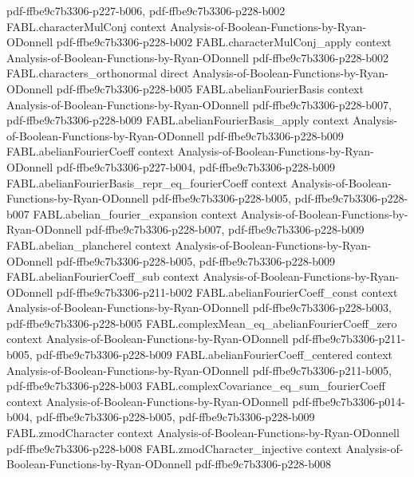 \begin{theorem}
  {pdf-ffbe9c7b3306-p227-b006,
    pdf-ffbe9c7b3306-p228-b002}
\proofstep
  {FABL.characterMulConj}
  {context}
  {Analysis-of-Boolean-Functions-by-Ryan-ODonnell}
  {pdf-ffbe9c7b3306-p228-b002}
\proofstep
  {FABL.characterMulConj_apply}
  {context}
  {Analysis-of-Boolean-Functions-by-Ryan-ODonnell}
  {pdf-ffbe9c7b3306-p228-b002}
\proofstep
  {FABL.characters_orthonormal}
  {direct}
  {Analysis-of-Boolean-Functions-by-Ryan-ODonnell}
  {pdf-ffbe9c7b3306-p228-b005}
\proofstep
  {FABL.abelianFourierBasis}
  {context}
  {Analysis-of-Boolean-Functions-by-Ryan-ODonnell}
  {pdf-ffbe9c7b3306-p228-b007,
    pdf-ffbe9c7b3306-p228-b009}
\proofstep
  {FABL.abelianFourierBasis_apply}
  {context}
  {Analysis-of-Boolean-Functions-by-Ryan-ODonnell}
  {pdf-ffbe9c7b3306-p228-b009}
\proofstep
  {FABL.abelianFourierCoeff}
  {context}
  {Analysis-of-Boolean-Functions-by-Ryan-ODonnell}
  {pdf-ffbe9c7b3306-p227-b004,
    pdf-ffbe9c7b3306-p228-b009}
\proofstep
  {FABL.abelianFourierBasis_repr_eq_fourierCoeff}
  {context}
  {Analysis-of-Boolean-Functions-by-Ryan-ODonnell}
  {pdf-ffbe9c7b3306-p228-b005,
    pdf-ffbe9c7b3306-p228-b007}
\proofstep
  {FABL.abelian_fourier_expansion}
  {context}
  {Analysis-of-Boolean-Functions-by-Ryan-ODonnell}
  {pdf-ffbe9c7b3306-p228-b007,
    pdf-ffbe9c7b3306-p228-b009}
\proofstep
  {FABL.abelian_plancherel}
  {context}
  {Analysis-of-Boolean-Functions-by-Ryan-ODonnell}
  {pdf-ffbe9c7b3306-p228-b005,
    pdf-ffbe9c7b3306-p228-b009}
\proofstep
  {FABL.abelianFourierCoeff_sub}
  {context}
  {Analysis-of-Boolean-Functions-by-Ryan-ODonnell}
  {pdf-ffbe9c7b3306-p211-b002}
\proofstep
  {FABL.abelianFourierCoeff_const}
  {context}
  {Analysis-of-Boolean-Functions-by-Ryan-ODonnell}
  {pdf-ffbe9c7b3306-p228-b003,
    pdf-ffbe9c7b3306-p228-b005}
\proofstep
  {FABL.complexMean_eq_abelianFourierCoeff_zero}
  {context}
  {Analysis-of-Boolean-Functions-by-Ryan-ODonnell}
  {pdf-ffbe9c7b3306-p211-b005,
    pdf-ffbe9c7b3306-p228-b009}
\proofstep
  {FABL.abelianFourierCoeff_centered}
  {context}
  {Analysis-of-Boolean-Functions-by-Ryan-ODonnell}
  {pdf-ffbe9c7b3306-p211-b005,
    pdf-ffbe9c7b3306-p228-b003}
\proofstep
  {FABL.complexCovariance_eq_sum_fourierCoeff}
  {context}
  {Analysis-of-Boolean-Functions-by-Ryan-ODonnell}
  {pdf-ffbe9c7b3306-p014-b004,
    pdf-ffbe9c7b3306-p228-b005,
    pdf-ffbe9c7b3306-p228-b009}
\proofstep
  {FABL.zmodCharacter}
  {context}
  {Analysis-of-Boolean-Functions-by-Ryan-ODonnell}
  {pdf-ffbe9c7b3306-p228-b008}
\proofstep
  {FABL.zmodCharacter_injective}
  {context}
  {Analysis-of-Boolean-Functions-by-Ryan-ODonnell}
  {pdf-ffbe9c7b3306-p228-b008}

\end{theorem}

